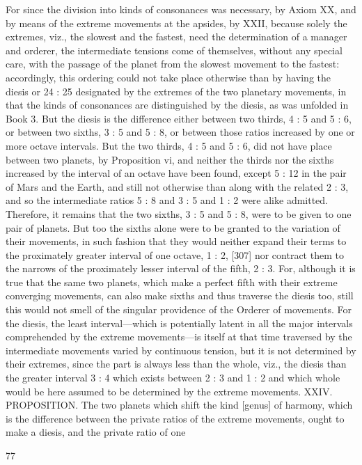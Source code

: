 \documentclass{article}
\begin{document}
For since the division into kinds of consonances was necessary, by Axiom
XX, and by means of the extreme movements at the apsides, by XXII,
because solely the extremes, viz., the slowest and the fastest, need the
determination of a manager and orderer, the intermediate tensions come
of themselves, without any special care, with the passage of the planet
from the slowest movement to the fastest: accordingly, this ordering
could not take place otherwise than by having the diesis or 24 : 25
designated by the extremes of the two planetary movements, in that the
kinds of consonances are distinguished by the diesis, as was unfolded in
Book 3.
But the diesis is the difference either between two thirds, 4 : 5 and 5 : 6,
or between two sixths, 3 : 5 and 5 : 8, or between those ratios increased
by one or more octave intervals. But the two thirds, 4 : 5 and 5 : 6, did
not have place between two planets, by Proposition vi, and neither the
thirds nor the sixths increased by the interval of an octave have been
found, except 5 : 12 in the pair of Mars and the Earth, and still not
otherwise than along with the related 2 : 3, and so the intermediate
ratios 5 : 8 and 3 : 5 and 1 : 2 were alike admitted. Therefore, it remains
that the two sixths, 3 : 5 and 5 : 8, were to be given to one pair of planets.
But too the sixths alone were to be granted to the variation of their
movements, in such fashion that they would neither expand their terms
to the proximately greater interval of one octave, 1 : 2, [307] nor contract
them to the narrows of the proximately lesser interval of the fifth, 2 : 3.
For, although it is true that the same two planets, which make a perfect
fifth with their extreme converging movements, can also make sixths and
thus traverse the diesis too, still this would not smell of the singular
providence of the Orderer of movements. For the diesis, the least
interval—which is potentially latent in all the major intervals
comprehended by the extreme movements—is itself at that time
traversed by the intermediate movements varied by continuous tension,
but it is not determined by their extremes, since the part is always less
than the whole, viz., the diesis than the greater interval 3 : 4 which exists
between 2 : 3 and 1 : 2 and which whole would be here assumed to be
determined by the extreme movements.
XXIV. PROPOSITION. The two planets which shift the kind [genus] of
harmony, which is the difference between the private ratios of the
extreme movements, ought to make a diesis, and the private ratio of one


77
\end{document}
